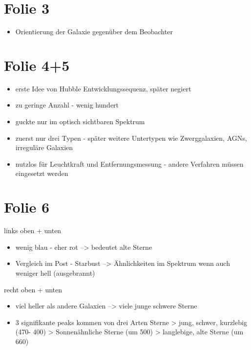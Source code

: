 





\section{Folie 3}


\begin{itemize}
\item Orientierung der Galaxie gegenüber dem Beobachter
\end{itemize}


\section{Folie 4+5}

\begin{itemize}
\item erste Idee von Hubble Entwicklungssequenz, später negiert
\item zu geringe Anzahl - wenig hundert
\item guckte nur im optisch sichtbaren Spektrum
\item zuerst nur drei Typen - später weitere Untertypen wie Zwerggalaxien, AGNs, irreguläre Galaxien
\item nutzlos für Leuchtkraft und Entfernungsmessung - andere Verfahren müssen eingesetzt werden
\end{itemize}


\section{Folie 6}

links oben + unten

\begin{itemize}
\item wenig blau - eher rot --> bedeutet alte Sterne
\item Vergleich im Post - Starbust --> Ähnlichkeiten im Spektrum wenn auch weniger hell (ausgebrannt)
\end{itemize}


recht oben + unten

\begin{itemize}
\item viel heller als andere Galaxien --> viele junge schwere Sterne
\item 3 signifikante peaks kommen von drei Arten Sterne
\subitem > jung, schwer, kurzlebig (470- 400)
\subitem > Sonnenähnliche Sterne (um 500)
\subitem > langlebige, alte Sterne (um 660)
\end{itemize}


